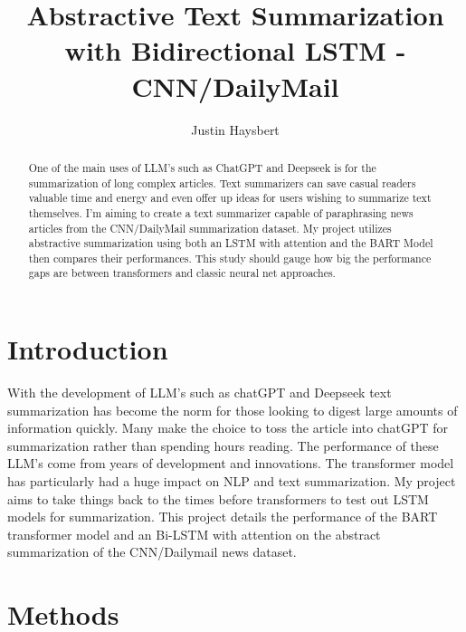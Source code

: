 \documentclass[11pt,a4paper]{article}
\title{Abstractive Text Summarization with Bidirectional LSTM - CNN/DailyMail}
\author{Justin Haysbert}\\
\date{}
\begin{document}
\maketitle
\begin{abstract}
	One of the main uses of LLM’s such as ChatGPT and Deepseek is for the  summarization of long complex articles. Text summarizers can save casual readers valuable time and energy and even offer up ideas for users wishing to summarize text themselves. I'm aiming to create a text summarizer capable of paraphrasing news articles from the CNN/DailyMail summarization dataset. My project utilizes abstractive summarization using both an LSTM with attention and the BART Model then compares their performances. This study should gauge how big the performance gaps are between transformers and classic neural net approaches. 
\end{abstract}


\section{Introduction}




With the development of LLM’s such as chatGPT and Deepseek text summarization has become the norm for those looking to digest large amounts of information quickly. Many make the choice to toss the article into chatGPT for summarization rather than spending hours reading. The performance of these LLM’s come from years of development and innovations. The transformer model has particularly had a huge impact on NLP and text summarization. My project aims to take things back to the times before transformers to test out LSTM models for summarization. This project details the performance of the BART transformer model and an Bi-LSTM with attention on the abstract summarization of the CNN/Dailymail news dataset. 



\section{Methods}
\end{document}
